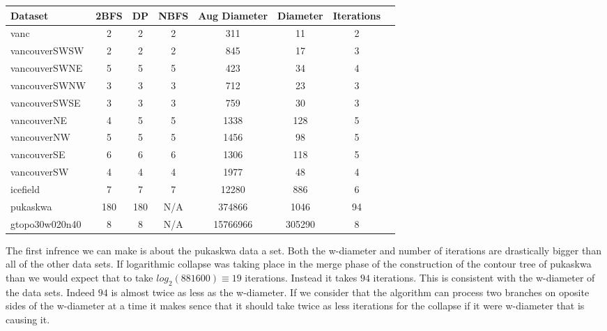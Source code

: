 \begin{center}
\begin{tabular}{l*{6}{c}r}
Dataset             & 2BFS  & DP    & NBFS    & Aug Diameter  & Diameter  & Iterations\\
\hline
vanc                & 2     & 2     & 2       & 311           & 11        & 2  \\
vancouverSWSW       & 2     & 2     & 2       & 845           & 17        & 3  \\
vancouverSWNE       & 5     & 5     & 5       & 423           & 34        & 4  \\
vancouverSWNW       & 3     & 3     & 3       & 712           & 23        & 3  \\
vancouverSWSE       & 3     & 3     & 3       & 759           & 30        & 3  \\
vancouverNE         & 4     & 5     & 5       & 1338          & 128       & 5  \\
vancouverNW         & 5     & 5     & 5       & 1456          & 98        & 5  \\
vancouverSE         & 6     & 6     & 6       & 1306          & 118       & 5  \\
vancouverSW         & 4     & 4     & 4       & 1977          & 48        & 4  \\
icefield            & 7     & 7     & 7       & 12280         & 886       & 6  \\
pukaskwa            & 180   & 180   & N/A     & 374866        & 1046      & 94 \\
gtopo30w020n40      & 8     & 8     & N/A     & 15766966      & 305290    & 8  \\

\end{tabular}
\end{center}

The first infrence we can make is about the pukaskwa data a set. Both the w-diameter and number of iterations are drastically bigger than all of the other data sets. If logarithmic collapse was taking place in the merge phase of the construction of the contour tree of pukaskwa than we would expect that to take $log_2(881600) \equiv 19$ iterations. Instead it takes $94$ iterations. This is consistent with the w-diameter of the data sets. Indeed $94$ is almost twice as less as the w-diameter. If we consider that the algorithm can process two branches on oposite sides of the w-diameter at a time it makes sence that it should take twice as less iterations for the collapse if it were w-diameter that is causing it.

